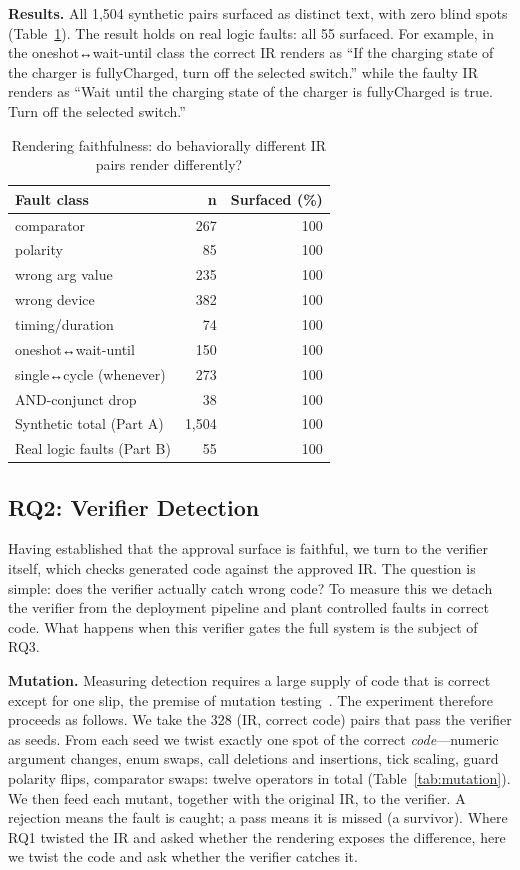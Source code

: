 \documentclass[sigconf,nonacm,anonymous,review]{acmart}
\begin{document}
\textbf{Results.} All 1,504 synthetic pairs surfaced as distinct text, with zero blind spots (Table~\ref{tab:faithful}). The result holds on real logic faults: all 55 surfaced. For example, in the oneshot↔wait-until class the correct IR renders as ``If the charging state of the charger is fullyCharged, turn off the selected switch.'' while the faulty IR renders as ``Wait until the charging state of the charger is fullyCharged is true. Turn off the selected switch.''

\begin{table}[t]
\centering
\caption{Rendering faithfulness: do behaviorally different IR pairs render differently?}
\label{tab:faithful}
\small
\begin{tabular}{lrr}
\toprule
Fault class & n & Surfaced (\%) \\
\midrule
comparator                & 267 & 100 \\
polarity                  & 85  & 100 \\
wrong arg value           & 235 & 100 \\
wrong device              & 382 & 100 \\
timing/duration           & 74  & 100 \\
oneshot↔wait-until        & 150 & 100 \\
single↔cycle (whenever)   & 273 & 100 \\
AND-conjunct drop         & 38  & 100 \\
\midrule
Synthetic total (Part A)   & 1,504 & 100 \\
Real logic faults (Part B) & 55  & 100 \\
\bottomrule
\end{tabular}
\end{table}

\subsection{RQ2: Verifier Detection}

Having established that the approval surface is faithful, we turn to the verifier itself, which checks generated code against the approved IR. The question is simple: does the verifier actually catch wrong code? To measure this we detach the verifier from the deployment pipeline and plant controlled faults in correct code. What happens when this verifier gates the full system is the subject of RQ3.

\textbf{Mutation.} Measuring detection requires a large supply of code that is correct except for one slip, the premise of mutation testing~\cite{mutationsurvey}. The experiment therefore proceeds as follows. We take the 328 (IR, correct code) pairs that pass the verifier as seeds. From each seed we twist exactly one spot of the correct \emph{code}—numeric argument changes, enum swaps, call deletions and insertions, tick scaling, guard polarity flips, comparator swaps: twelve operators in total (Table~\ref{tab:mutation}). We then feed each mutant, together with the original IR, to the verifier. A rejection means the fault is caught; a pass means it is missed (a survivor). Where RQ1 twisted the IR and asked whether the rendering exposes the difference, here we twist the code and ask whether the verifier catches it.
\end{document}
